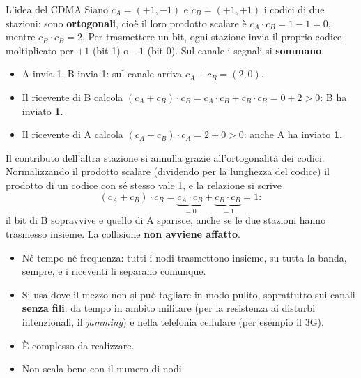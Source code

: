 \begin{esempio}{L'idea del CDMA}
Siano $c_A = (+1, -1)$ e $c_B = (+1, +1)$ i codici di due stazioni: sono \textbf{ortogonali}, cioè il loro prodotto scalare è
$c_A \cdot c_B = 1 - 1 = 0$, mentre $c_B \cdot c_B = 2$. Per trasmettere un bit, ogni stazione invia il proprio codice moltiplicato per
$+1$ (bit 1) o $-1$ (bit 0). Sul canale i segnali si \textbf{sommano}.
\begin{itemize}
    \item A invia 1, B invia 1: sul canale arriva $c_A + c_B = (2, 0)$.
    \item Il ricevente di B calcola $(c_A + c_B)\cdot c_B = c_A\cdot c_B + c_B \cdot c_B = 0 + 2 > 0$: B ha inviato \textbf{1}.
    \item Il ricevente di A calcola $(c_A + c_B)\cdot c_A = 2 + 0 > 0$: anche A ha inviato \textbf{1}.
\end{itemize}
Il contributo dell'altra stazione si annulla grazie all'ortogonalità dei codici. Normalizzando il prodotto scalare (dividendo per la
lunghezza del codice) il prodotto di un codice con sé stesso vale 1, e la relazione si scrive
$$(c_A + c_B)\cdot c_B = \underbrace{c_A\cdot c_B}_{=0} + \underbrace{c_B\cdot c_B}_{=1} = 1:$$
il bit di B sopravvive e quello di A sparisce, anche se le due stazioni hanno trasmesso insieme. La collisione \textbf{non avviene affatto}.
\end{esempio}

\begin{itemize}
    \item Né tempo né frequenza: tutti i nodi trasmettono insieme, su tutta la banda, sempre, e i riceventi li separano comunque.
    \item Si usa dove il mezzo non si può tagliare in modo pulito, soprattutto sui canali \textbf{senza fili}: da tempo in ambito
          militare (per la resistenza ai disturbi intenzionali, il \emph{jamming}) e nella telefonia cellulare (per esempio il 3G).
    \item[\icross] È complesso da realizzare.
    \item[\icross] Non scala bene con il numero di nodi.
\end{itemize}


